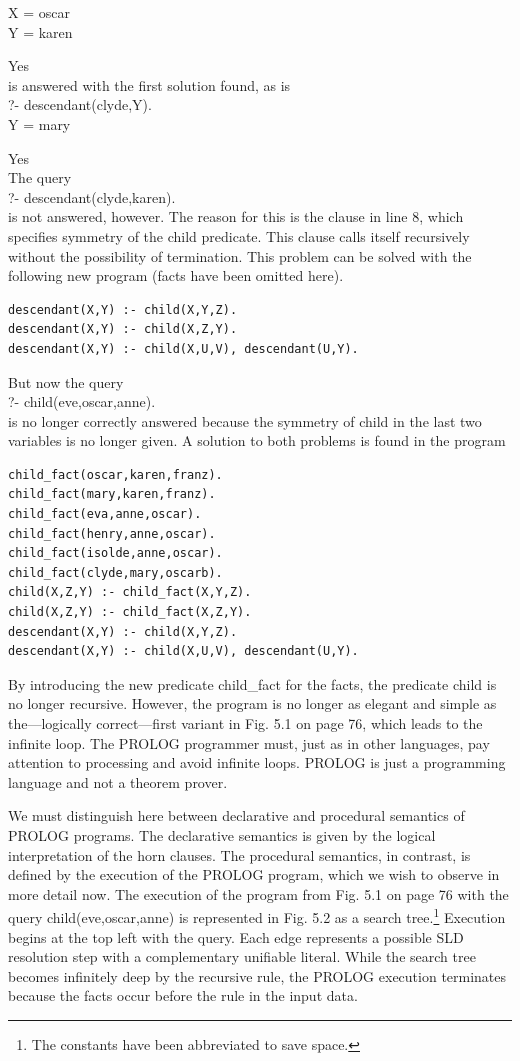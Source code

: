 \documentclass[10pt]{book}
\begin{document}
X = oscar\\
Y = karen

Yes\\
is answered with the first solution found, as is\\
?- descendant(clyde,Y).\\
Y = mary

Yes\\
The query\\
?- descendant(clyde,karen).\\
is not answered, however. The reason for this is the clause in line 8, which specifies symmetry of the child predicate. This clause calls itself recursively without the possibility of termination. This problem can be solved with the following new program (facts have been omitted here).

\begin{verbatim}
descendant(X,Y) :- child(X,Y,Z).
descendant(X,Y) :- child(X,Z,Y).
descendant(X,Y) :- child(X,U,V), descendant(U,Y).
\end{verbatim}

But now the query\\
?- child(eve,oscar,anne).\\
is no longer correctly answered because the symmetry of child in the last two variables is no longer given. A solution to both problems is found in the program

\begin{verbatim}
child_fact(oscar,karen,franz).
child_fact(mary,karen,franz).
child_fact(eva,anne,oscar).
child_fact(henry,anne,oscar).
child_fact(isolde,anne,oscar).
child_fact(clyde,mary,oscarb).
child(X,Z,Y) :- child_fact(X,Y,Z).
child(X,Z,Y) :- child_fact(X,Z,Y).
descendant(X,Y) :- child(X,Y,Z).
descendant(X,Y) :- child(X,U,V), descendant(U,Y).
\end{verbatim}

By introducing the new predicate child\_fact for the facts, the predicate child is no longer recursive. However, the program is no longer as elegant and simple as the—logically correct—first variant in Fig. 5.1 on page 76, which leads to the infinite loop. The PROLOG programmer must, just as in other languages, pay attention to processing and avoid infinite loops. PROLOG is just a programming language and not a theorem prover.

We must distinguish here between declarative and procedural semantics of PROLOG programs. The declarative semantics is given by the logical interpretation of the horn clauses. The procedural semantics, in contrast, is defined by the execution of the PROLOG program, which we wish to observe in more detail now. The execution of the program from Fig. 5.1 on page 76 with the query child(eve,oscar,anne) is represented in Fig. 5.2 as a search tree.\footnote{The constants have been abbreviated to save space.} Execution begins at the top left with the query. Each edge represents a possible SLD resolution step with a complementary unifiable literal. While the search tree becomes infinitely deep by the recursive rule, the PROLOG execution terminates because the facts occur before the rule in the input data.
\end{document}
